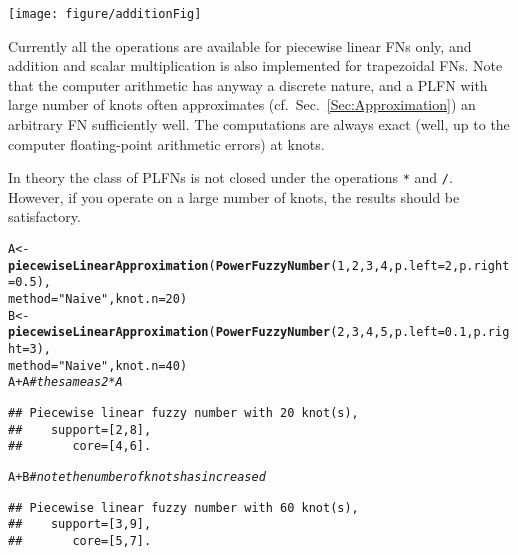 \documentclass[11pt]{article}\usepackage[]{graphicx}\usepackage[]{color}
\makeatletter
\newcommand{\hlnum}[1]{\textcolor[rgb]{0.686,0.059,0.569}{#1}}%
\newcommand{\hlstr}[1]{\textcolor[rgb]{0.192,0.494,0.8}{#1}}%
\newcommand{\hlcom}[1]{\textcolor[rgb]{0.678,0.584,0.686}{\textit{#1}}}%
\newcommand{\hlopt}[1]{\textcolor[rgb]{0,0,0}{#1}}%
\newcommand{\hlstd}[1]{\textcolor[rgb]{0.345,0.345,0.345}{#1}}%
\newcommand{\hlkwb}[1]{\textcolor[rgb]{0.69,0.353,0.396}{#1}}%
\newcommand{\hlkwc}[1]{\textcolor[rgb]{0.333,0.667,0.333}{#1}}%
\newcommand{\hlkwd}[1]{\textcolor[rgb]{0.737,0.353,0.396}{\textbf{#1}}}%
\newenvironment{kframe}{%
 \def\at@end@of@kframe{}%
 \ifinner\ifhmode%
  \def\at@end@of@kframe{\end{minipage}}%
  \begin{minipage}{\columnwidth}%
 \fi\fi%
 \def\FrameCommand##1{\hskip\@totalleftmargin \hskip-\fboxsep
 \colorbox{shadecolor}{##1}\hskip-\fboxsep
     \hskip-\linewidth \hskip-\@totalleftmargin \hskip\columnwidth}%
 \MakeFramed {\advance\hsize-\width
   \@totalleftmargin\z@ \linewidth\hsize
   \@setminipage}}%
 {\par\unskip\endMakeFramed%
 \at@end@of@kframe}
\newenvironment{knitrout}{}{} %
\makeatother
\begin{document}
\begin{center}
\begin{knitrout}\small
{}\color{fgcolor}

{\centering \texttt{[image: figure/additionFig]} 

}



\end{knitrout}
\end{center}


Currently all the operations are available
for piecewise linear FNs only,
and addition and scalar multiplication
is also implemented for trapezoidal FNs.
Note that the computer arithmetic has anyway
a discrete nature, and a PLFN with large number
of knots often approximates (cf.~Sec.~\ref{Sec:Approximation})
an arbitrary FN sufficiently well.
The computations are always exact (well, up to the computer
floating-point arithmetic errors) at knots.

In theory the class of PLFNs is not closed
under the operations \texttt{*} and \texttt{/}.
However, if you operate on a large number of knots,
the results should be satisfactory.



\begin{knitrout}\small
{}\color{fgcolor}\begin{kframe}
\begin{alltt}
\hlstd{A} \hlkwb{<-} \hlkwd{piecewiseLinearApproximation}\hlstd{(}\hlkwd{PowerFuzzyNumber}\hlstd{(}\hlnum{1}\hlstd{,}\hlnum{2}\hlstd{,}\hlnum{3}\hlstd{,}\hlnum{4}\hlstd{,}\hlkwc{p.left}\hlstd{=}\hlnum{2}\hlstd{,}\hlkwc{p.right}\hlstd{=}\hlnum{0.5}\hlstd{),}
   \hlkwc{method}\hlstd{=}\hlstr{"Naive"}\hlstd{,} \hlkwc{knot.n}\hlstd{=}\hlnum{20}\hlstd{)}
\hlstd{B} \hlkwb{<-} \hlkwd{piecewiseLinearApproximation}\hlstd{(}\hlkwd{PowerFuzzyNumber}\hlstd{(}\hlnum{2}\hlstd{,}\hlnum{3}\hlstd{,}\hlnum{4}\hlstd{,}\hlnum{5}\hlstd{,}\hlkwc{p.left}\hlstd{=}\hlnum{0.1}\hlstd{,}\hlkwc{p.right}\hlstd{=}\hlnum{3}\hlstd{),}
   \hlkwc{method}\hlstd{=}\hlstr{"Naive"}\hlstd{,} \hlkwc{knot.n}\hlstd{=}\hlnum{40}\hlstd{)}
\hlstd{A}\hlopt{+}\hlstd{A} \hlcom{# the same as 2*A}
\end{alltt}
\begin{verbatim}
## Piecewise linear fuzzy number with 20 knot(s),
##    support=[2,8],
##       core=[4,6].
\end{verbatim}
\begin{alltt}
\hlstd{A}\hlopt{+}\hlstd{B} \hlcom{# note the number of knots has increased}
\end{alltt}
\begin{verbatim}
## Piecewise linear fuzzy number with 60 knot(s),
##    support=[3,9],
##       core=[5,7].
\end{verbatim}
\end{kframe}
\end{knitrout}
\end{document}
